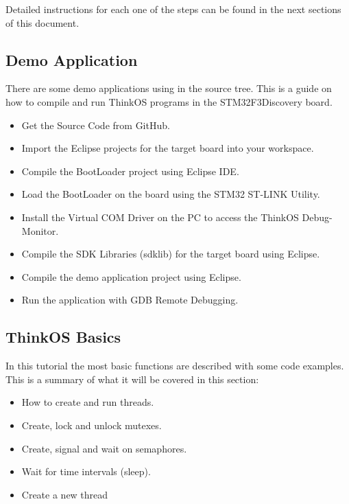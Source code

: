 Detailed instructions for each one of the steps can be found in the next sections of this document. 

\subsection{Demo Application}
There are some demo applications using \ThinkOS in the source tree. This is a guide on how to compile and run ThinkOS programs in the STM32F3Discovery board. 


\begin{itemize}
\item Get the \ThinkOS Source Code from GitHub.
\item Import the Eclipse projects for the target board into your workspace.
\item Compile the \ThinkOS BootLoader project using Eclipse IDE.
\item Load the \ThinkOS BootLoader on the board using the STM32 ST-LINK Utility.
\item Install the Virtual COM Driver on the PC to access the ThinkOS Debug-Monitor.
\item Compile the SDK Libraries (sdklib) for the target board using Eclipse.
\item Compile the demo application project using Eclipse.
\item Run the application with GDB Remote Debugging.
\end{itemize}



\subsection{ThinkOS Basics}

\lstset {language=C99}

In this tutorial the most basic \ThinkOS functions are described with some code examples. This is a summary of what it will be covered in this section:

\begin{itemize}
\item How to create and run threads.
\item Create, lock and unlock mutexes.
\item Create, signal and wait on semaphores.
\item Wait for time intervals (sleep).
\item Create a new thread
\end{itemize}

